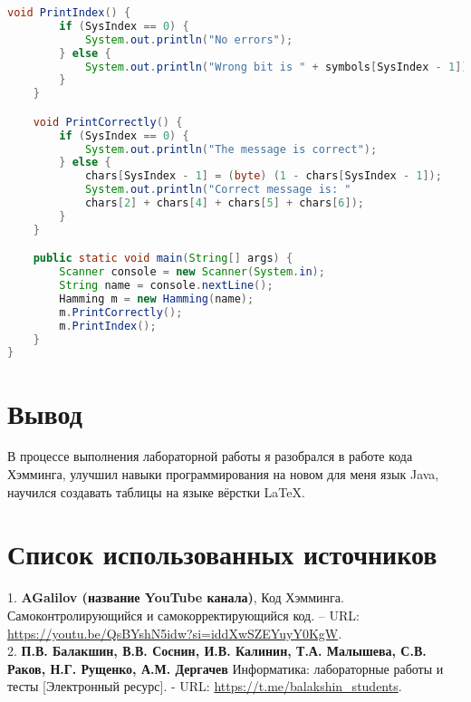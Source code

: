 \begin{flushleft}
\begin{lstlisting}[caption={Исходный код программы}, language=Java, captionpos=b]
    void PrintIndex() {
        if (SysIndex == 0) {
            System.out.println("No errors");
        } else {
            System.out.println("Wrong bit is " + symbols[SysIndex - 1]);
        }
    }

    void PrintCorrectly() {
        if (SysIndex == 0) {
            System.out.println("The message is correct");
        } else {
            chars[SysIndex - 1] = (byte) (1 - chars[SysIndex - 1]);
            System.out.println("Correct message is: " 
            chars[2] + chars[4] + chars[5] + chars[6]);
        }
    }

    public static void main(String[] args) {
        Scanner console = new Scanner(System.in);
        String name = console.nextLine();
        Hamming m = new Hamming(name);
        m.PrintCorrectly();
        m.PrintIndex();
    }
}
\end{lstlisting}

\section{Вывод}
В процессе выполнения лабораторной работы я разобрался в работе кода Хэмминга, улучшил навыки программирования на новом для меня язык Java, научился создавать таблицы на языке вёрстки \LaTeX.

\section{Список использованных источников}
1. \textbf{AGalilov (название YouTube канала)}, Код Хэмминга. Самоконтролирующийся и самокорректирующийся код. – URL: \href{https://youtu.be/QsBYshN5idw?si=iddXwSZEYuyY0KgW}{https://youtu.be/QsBYshN5idw?si=iddXwSZEYuyY0KgW}. \\
2. \textbf{П.В. Балакшин, В.В. Соснин, И.В. Калинин, Т.А. Малышева, С.В. Раков, Н.Г. Рущенко, А.М. Дергачев} Информатика: лабораторные работы и тесты [Электронный ресурс]. - URL: \href{https://t.me/balakshin_students}{https://t.me/balakshin\_students}.
\end{flushleft}
